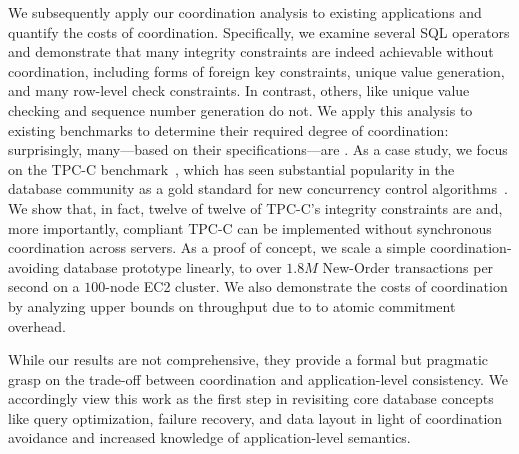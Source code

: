 
We subsequently apply our \iconfluence coordination analysis to
existing applications and quantify the costs of
coordination. Specifically, we examine several SQL operators and
demonstrate that many integrity constraints are indeed achievable
without coordination, including forms of foreign key constraints,
unique value generation, and many row-level check constraints. In
contrast, others, like unique value checking and sequence number
generation do not. We apply this analysis to existing benchmarks to
determine their required degree of coordination: surprisingly,
many---based on their specifications---are \cfree. As a case study, we
focus on the TPC-C benchmark~\cite{tpcc}, which has seen substantial
popularity in the database community as a gold standard for new
concurrency control
algorithms~\cite{abadi-vll,jones-dtxn,schism,calvin,hstore}. We show
that, in fact, twelve of twelve of TPC-C's integrity constraints are
\iconfluent and, more importantly, compliant TPC-C can be implemented
without synchronous coordination across servers. As a proof of
concept, we scale a simple coordination-avoiding database prototype
linearly, to over $1.8M$ New-Order transactions per second on a
$100$-node EC2 cluster. We also demonstrate the costs of coordination
by analyzing upper bounds on throughput due to to atomic commitment
overhead.

While our results are not comprehensive, they provide a formal but
pragmatic grasp on the trade-off between coordination and
application-level consistency. We accordingly view this work as the
first step in revisiting core database concepts like query
optimization, failure recovery, and data layout in light of
coordination avoidance and increased knowledge of application-level
semantics.


